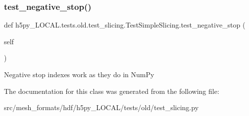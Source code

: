 \subsubsection{\texorpdfstring{test\+\_\+negative\+\_\+stop()}{test\_negative\_stop()}}
{\footnotesize\ttfamily def h5py\+\_\+\+L\+O\+C\+A\+L.\+tests.\+old.\+test\+\_\+slicing.\+Test\+Simple\+Slicing.\+test\+\_\+negative\+\_\+stop (\begin{DoxyParamCaption}\item[{}]{self }\end{DoxyParamCaption})}

\begin{DoxyVerb}Negative stop indexes work as they do in NumPy \end{DoxyVerb}
 

The documentation for this class was generated from the following file\+:\begin{DoxyCompactItemize}
\item 
src/mesh\+\_\+formats/hdf/h5py\+\_\+\+L\+O\+C\+A\+L/tests/old/test\+\_\+slicing.\+py\end{DoxyCompactItemize}
